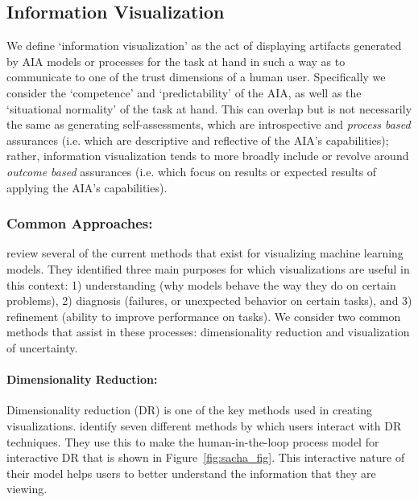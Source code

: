 
\subsection{Information Visualization} \label{sec:vis_dr}
We define `information visualization' as the act of displaying artifacts generated by AIA models or processes for the task at hand in such a way as to communicate to one of the trust dimensions of a human user. Specifically we consider the `competence' and `predictability' of the AIA, as well as the `situational normality' of the task at hand. This can overlap but is not necessarily the same as generating self-assessments, which are introspective and \emph{process based} assurances (i.e. which are descriptive and reflective of the AIA's capabilities); rather, information visualization tends to more broadly include or revolve around \emph{outcome based} assurances (i.e. which focus on results or expected results of applying the AIA's capabilities).  

\subsubsection{Common Approaches:}
\citet{Liu2017-xw} review several of the current methods that exist for visualizing machine learning models. They identified three main purposes for which visualizations are useful in this context: 1) understanding (why models behave the way they do on certain problems), 2) diagnosis (failures, or unexpected behavior on certain tasks), and 3) refinement (ability to improve performance on tasks). 
We consider two common methods that assist in these processes: dimensionality reduction and visualization of uncertainty.

\paragraph{Dimensionality Reduction:}
Dimensionality reduction (DR) is one of the key methods used in creating visualizations. \citet{Sacha2017-hf} identify seven different methods by which users interact with DR techniques. They use this to make the human-in-the-loop process model for interactive DR that is shown in Figure~\ref{fig:sacha_fig}. This interactive nature of their model helps users to better understand the information that they are viewing.

